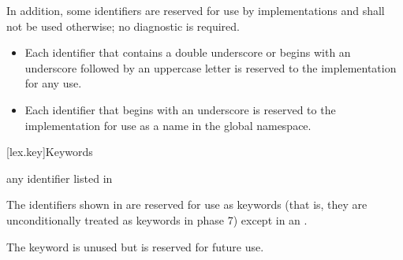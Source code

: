 \documentclass{wg21}
\begin{document}
\pnum
{}%
%
%
In addition, some identifiers are reserved for use by \Cpp{}
implementations and shall
not be used otherwise; no diagnostic is required.
\begin{itemize}
    \item
    Each identifier that contains a double underscore
    \tcode{\unun}
    or begins with an underscore followed by
    an uppercase letter
    is reserved to the implementation for any use.
    \item
    Each identifier that begins with an underscore is
    reserved to the implementation for use as a name in the global namespace.%
\end{itemize}%

[lex.key]{Keywords}

\begin{bnf}
    \br
    \textnormal{any identifier listed in }\br
    \br
    \br
\end{bnf}

\pnum
{}%
The identifiers shown in  are reserved for use
as keywords (that is, they are unconditionally treated as keywords in
phase 7) except in an .
\begin{note}
    The  keyword is unused but
    is reserved for future use.
\end{note}
\end{document}
